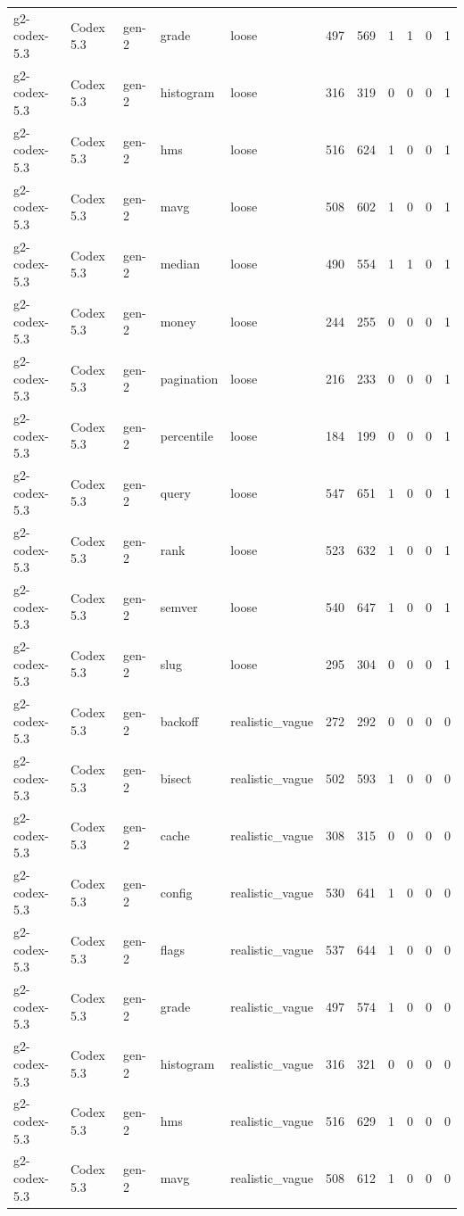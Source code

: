 \begin{tabular}{lllllllllll}
g2-codex-5.3 & Codex 5.3 & gen-2 & grade & loose & 497 & 569 & 1 & 1 & 0 & 1 \\
g2-codex-5.3 & Codex 5.3 & gen-2 & histogram & loose & 316 & 319 & 0 & 0 & 0 & 1 \\
g2-codex-5.3 & Codex 5.3 & gen-2 & hms & loose & 516 & 624 & 1 & 0 & 0 & 1 \\
g2-codex-5.3 & Codex 5.3 & gen-2 & mavg & loose & 508 & 602 & 1 & 0 & 0 & 1 \\
g2-codex-5.3 & Codex 5.3 & gen-2 & median & loose & 490 & 554 & 1 & 1 & 0 & 1 \\
g2-codex-5.3 & Codex 5.3 & gen-2 & money & loose & 244 & 255 & 0 & 0 & 0 & 1 \\
g2-codex-5.3 & Codex 5.3 & gen-2 & pagination & loose & 216 & 233 & 0 & 0 & 0 & 1 \\
g2-codex-5.3 & Codex 5.3 & gen-2 & percentile & loose & 184 & 199 & 0 & 0 & 0 & 1 \\
g2-codex-5.3 & Codex 5.3 & gen-2 & query & loose & 547 & 651 & 1 & 0 & 0 & 1 \\
g2-codex-5.3 & Codex 5.3 & gen-2 & rank & loose & 523 & 632 & 1 & 0 & 0 & 1 \\
g2-codex-5.3 & Codex 5.3 & gen-2 & semver & loose & 540 & 647 & 1 & 0 & 0 & 1 \\
g2-codex-5.3 & Codex 5.3 & gen-2 & slug & loose & 295 & 304 & 0 & 0 & 0 & 1 \\
g2-codex-5.3 & Codex 5.3 & gen-2 & backoff & realistic\_vague & 272 & 292 & 0 & 0 & 0 & 0 \\
g2-codex-5.3 & Codex 5.3 & gen-2 & bisect & realistic\_vague & 502 & 593 & 1 & 0 & 0 & 0 \\
g2-codex-5.3 & Codex 5.3 & gen-2 & cache & realistic\_vague & 308 & 315 & 0 & 0 & 0 & 0 \\
g2-codex-5.3 & Codex 5.3 & gen-2 & config & realistic\_vague & 530 & 641 & 1 & 0 & 0 & 0 \\
g2-codex-5.3 & Codex 5.3 & gen-2 & flags & realistic\_vague & 537 & 644 & 1 & 0 & 0 & 0 \\
g2-codex-5.3 & Codex 5.3 & gen-2 & grade & realistic\_vague & 497 & 574 & 1 & 0 & 0 & 0 \\
g2-codex-5.3 & Codex 5.3 & gen-2 & histogram & realistic\_vague & 316 & 321 & 0 & 0 & 0 & 0 \\
g2-codex-5.3 & Codex 5.3 & gen-2 & hms & realistic\_vague & 516 & 629 & 1 & 0 & 0 & 0 \\
g2-codex-5.3 & Codex 5.3 & gen-2 & mavg & realistic\_vague & 508 & 612 & 1 & 0 & 0 & 0 \\

\end{tabular}
